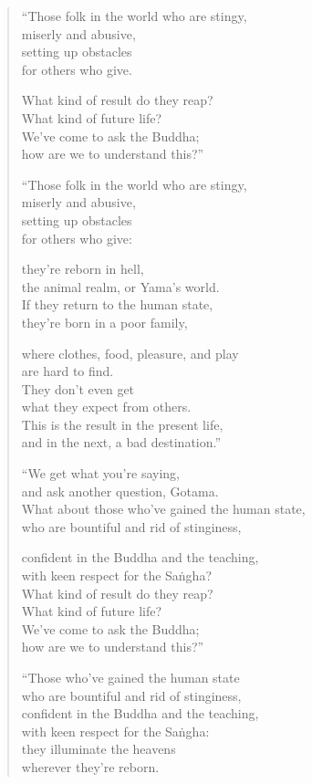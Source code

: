 \documentclass[12pt,openany]{book}%
\begin{document}
\begin{verse}%
“Those folk in the world who are stingy, \\
miserly and abusive, \\
setting up obstacles \\
for others who give. 

What kind of result do they reap? \\
What kind of future life? \\
We’ve come to ask the Buddha; \\
how are we to understand this?” 

“Those folk in the world who are stingy, \\
miserly and abusive, \\
setting up obstacles \\
for others who give: 

they’re reborn in hell, \\
the animal realm, or Yama’s world. \\
If they return to the human state, \\
they’re born in a poor family, 

where clothes, food, pleasure, and play \\
are hard to find. \\
They don’t even get \\
what they expect from others. \\
This is the result in the present life, \\
and in the next, a bad destination.” 

“We get what you’re saying, \\
and ask another question, Gotama. \\
What about those who’ve gained the human state, \\
who are bountiful and rid of stinginess, 

confident in the Buddha and the teaching, \\
with keen respect for the \textsanskrit{Saṅgha}? \\
What kind of result do they reap? \\
What kind of future life? \\
We’ve come to ask the Buddha; \\
how are we to understand this?” 

“Those who’ve gained the human state \\
who are bountiful and rid of stinginess, \\
confident in the Buddha and the teaching, \\
with keen respect for the \textsanskrit{Saṅgha}: \\
they illuminate the heavens \\
wherever they’re reborn. 


\end{verse}
\end{document}
